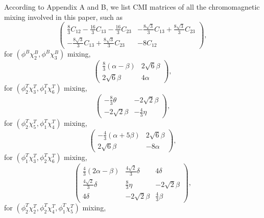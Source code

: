 \documentclass[12pt,onecolumn,floatfix,nofootinbib]{revtex4}
\begin{document}
\label{AppendixC} \setcounter{equation}{0} \renewcommand{\theequation}{C%
\arabic{equation}} According to Appendix A and B, we list CMI matrices of
all the chromomagnetic mixing involved in this paper, such as
\begin{equation}  \label{mixing23}
\begin{pmatrix}
\frac{8}{3}C_{12}-\frac{16}{3}C_{13}-\frac{16}{3}C_{23} & -\frac{8\sqrt{3}}{3%
}C_{13}+\frac{8\sqrt{3}}{3}C_{23} \\
-\frac{8\sqrt{3}}{3}C_{13}+\frac{8\sqrt{3}}{3}C_{23} & -8C_{12}
\end{pmatrix}%
,
\end{equation}
for $(\phi^{B}\chi_{2}^{B},\phi^{B}\chi_{3}^{B})$ mixing,
\begin{equation}  \label{21mixing36}
\begin{pmatrix}
\frac{8}{3}(\alpha-\beta) & 2\sqrt{6}\beta \\
2\sqrt{6}\beta & 4\alpha%
\end{pmatrix}%
,
\end{equation}
for $(\phi_{2}^{T}\chi_{3}^{T},\phi_{1}^{T}\chi_{6}^{T})$ mixing,
\begin{equation}  \label{21mixing54}
\begin{pmatrix}
-\frac{8}{3}\theta & -2\sqrt{2}\beta \\
-2\sqrt{2}\beta & -\frac{4}{3}\eta%
\end{pmatrix}%
,
\end{equation}
for $(\phi_{2}^{T}\chi_{5}^{T},\phi_{1}^{T}\chi_{4}^{T})$ mixing,
\begin{equation}  \label{12mixing36}
\begin{pmatrix}
-\frac{4}{3}(\alpha+5\beta) & 2\sqrt{6}\beta \\
2\sqrt{6}\beta & -8\alpha%
\end{pmatrix}%
,
\end{equation}
for $(\phi_{1}^{T}\chi_{3}^{T},\phi_{2}^{T}\chi_{6}^{T})$ mixing,
\begin{equation}  \label{221mixing245}
\begin{pmatrix}
\frac{4}{3}(2\alpha-\beta) & \frac{4\sqrt{2}}{3}\delta & 4\delta \\
\frac{4\sqrt{2}}{3}\delta & \frac{8}{3}\eta & -2\sqrt{2}\beta \\
4\delta & -2\sqrt{2}\beta & \frac{4}{3}\beta%
\end{pmatrix}%
,
\end{equation}
for $(\phi_{2}^{T}\chi_{2}^{T},\phi_{2}^{T}\chi_{4}^{T},\phi_{1}^{T}%
\chi_{5}^{T})$ mixing,
\end{document}
